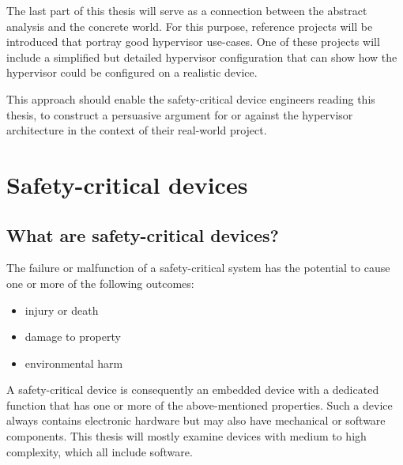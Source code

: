 The last part of this thesis will serve as a connection between the abstract analysis and the concrete world. For this purpose, reference projects will be introduced that portray good hypervisor use-cases. One of these projects will include a simplified but detailed hypervisor configuration that can show how the hypervisor could be configured on a realistic device. 

This approach should enable the safety-critical device engineers reading this thesis, to construct a persuasive argument for or against the hypervisor architecture in the context of their real-world project.

\section{Safety-critical devices}
\subsection{What are safety-critical devices?}
The failure or malfunction of a safety-critical system has the potential to cause one or more of the following outcomes:
\begin{itemize}
\item injury or death
\item damage to property
\item environmental harm
\end{itemize}
A safety-critical device is consequently an embedded device with a dedicated function that has one or more of the above-mentioned properties. Such a device always contains electronic hardware but may also have mechanical or software components. This thesis will mostly examine devices with medium to high complexity, which all include software.

